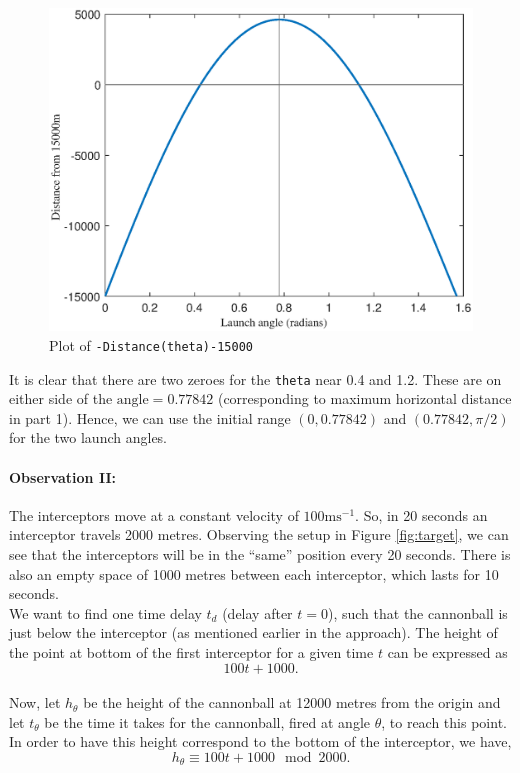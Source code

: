 \documentclass[11pt]{report}
\begin{document}
 \begin{figure}[h]
	\centering
  	\includegraphics[scale=0.5]{assets/fzero_theta.eps}
  	\caption{Plot of \texttt{-Distance(theta)-15000}}
  	\label{fig:fzero}
\end{figure}

It is clear that there are two zeroes for the \texttt{theta} near 0.4 and 1.2. These are on either side of the $\text{angle}=0.77842$ (corresponding to maximum horizontal distance in part 1). Hence, we can use the initial range $(0, 0.77842)$ and $(0.77842, \pi/2)$ for the two launch angles.

\paragraph{Observation II:} The interceptors move at a constant velocity of $100\text{ms}^{-1}$. So, in 20 seconds an interceptor travels 2000 metres. Observing the setup in Figure \ref{fig:target}, we can see that the interceptors will be in the ``same'' position every 20 seconds. There is also an empty space of 1000 metres between each interceptor, which lasts for 10 seconds. \\

We want to find one time delay $t_d$ (delay after $t=0$), such that the cannonball is just below the interceptor (as mentioned earlier in the approach). The height of the point at bottom of the first interceptor for a given time $t$ can be expressed as $$ 100t + 1000. $$\\

Now, let $h_{\theta}$ be the height of the cannonball at 12000 metres from the origin and let $t_{\theta}$ be the time it takes for the cannonball, fired at angle $\theta$, to reach this point. In order to have this height correspond to the bottom of the interceptor, we have, $$h_{\theta} \equiv 100t + 1000 \mod 2000.$$ \\
\end{document}
